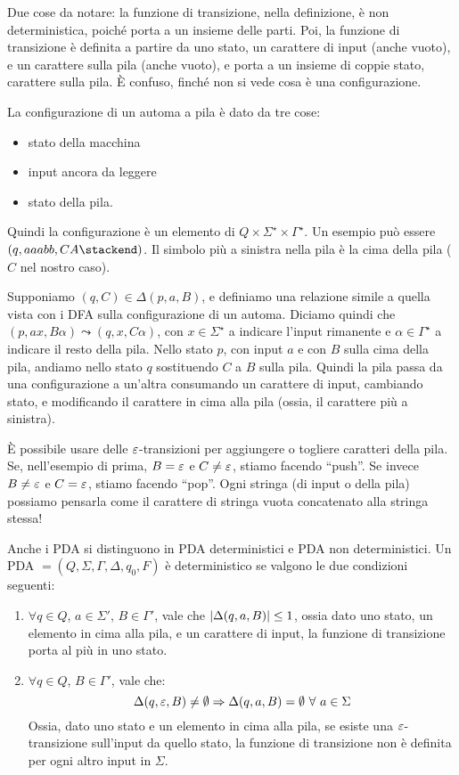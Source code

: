 Due cose da notare: la funzione di transizione, nella definizione, \`e non deterministica, poich\'e porta a un insieme delle parti.
Poi, la funzione di transizione \`e definita a partire da uno stato, un carattere di input (anche vuoto), e un carattere sulla pila (anche vuoto), e porta a un insieme di coppie stato, carattere sulla pila.
\`E confuso, finch\'e non si vede cosa \`e una configurazione.

La configurazione di un automa a pila \`e dato da tre cose:
\begin{itemize}
	\item stato della macchina
	\item input ancora da leggere
	\item stato della pila.
\end{itemize}
Quindi la configurazione \`e un elemento di $Q \times \Sigma^{\star} \times \Gamma^{\star}$. Un esempio pu\`o essere $(q, aaabb, CA\stackend)$.
Il simbolo pi\`u a sinistra nella pila \`e la cima della pila ($C$ nel nostro caso).

Supponiamo $(q, C) \in \Delta(p, a, B)$, e definiamo una relazione simile a quella vista con i DFA sulla configurazione di un automa.
Diciamo quindi che $(p, ax, B\alpha) \leadsto (q, x, C\alpha)$, con $x \in \Sigma^{\star}$ a indicare l'input rimanente e $\alpha \in \Gamma^{\star}$ a indicare il resto della pila.
Nello stato $p$, con input $a$ e con $B$ sulla cima della pila, andiamo nello stato $q$ sostituendo $C$ a $B$ sulla pila.
Quindi la pila passa da una configurazione a un'altra consumando un carattere di input, cambiando stato, e modificando il carattere in cima alla pila (ossia, il carattere pi\`u a sinistra).

\`E possibile usare delle $\varepsilon$-transizioni per aggiungere o togliere caratteri della pila.
Se, nell'esempio di prima, $B = \varepsilon$ e $C \neq \varepsilon$, stiamo facendo ``push''.
Se invece $B \neq \varepsilon$ e $C = \varepsilon$, stiamo facendo ``pop''.
Ogni stringa (di input o della pila) possiamo pensarla come il carattere di stringa vuota concatenato alla stringa stessa!

Anche i PDA si distinguono in PDA deterministici e PDA non deterministici.
Un PDA $ = (Q, \Sigma, \Gamma, \Delta, q_0, F )$ \`e deterministico se valgono le due condizioni seguenti:
\begin{enumerate}
	\item $\forall q \in Q$, $a \in \Sigma'$, $B \in \Gamma'$, vale che $\left\lvert{\Delta(q,a,B)}\right\rvert \le 1$, ossia dato uno stato, un elemento in cima alla pila, e un carattere di input, la funzione di transizione porta al pi\`u in uno stato.
	\item $\forall q \in Q$, $B \in \Gamma'$, vale che:
	\[
	\Delta(q, \emptystring, B) \neq \emptyset \implies \Delta(q, a, B) = \emptyset \forall a \in \Sigma
	\]
	Ossia, dato uno stato e un elemento in cima alla pila, se esiste una $\varepsilon$-transizione sull'input da quello stato, la funzione di transizione non \`e definita per ogni altro input in $\Sigma$. 
\end{enumerate}

